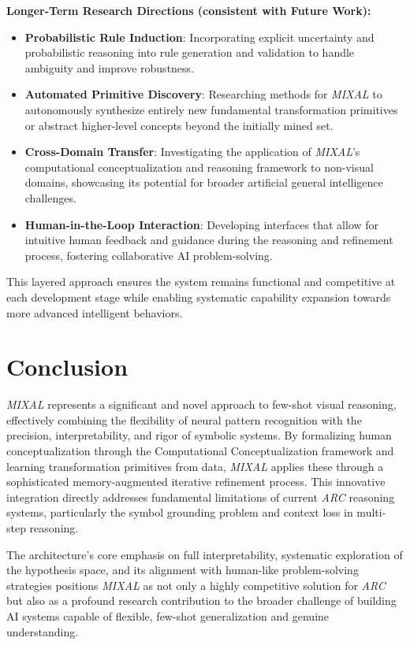 \documentclass[12pt]{article}
\newcommand{\arc}{\textit{ARC}}
\newcommand{\MIXAL}{\textit{MIXAL}}
\begin{document}
\textbf{Longer-Term Research Directions (consistent with Future Work):}
\begin{itemize}[noitemsep,topsep=0pt]
\item\textbf{Probabilistic Rule Induction}: Incorporating explicit uncertainty and probabilistic reasoning into rule generation and validation to handle ambiguity and improve robustness.
\item\textbf{Automated Primitive Discovery}: Researching methods for \MIXAL{} to autonomously synthesize entirely new fundamental transformation primitives or abstract higher-level concepts beyond the initially mined set.
\item\textbf{Cross-Domain Transfer}: Investigating the application of \MIXAL{}'s computational conceptualization and reasoning framework to non-visual domains, showcasing its potential for broader artificial general intelligence challenges.
\item\textbf{Human-in-the-Loop Interaction}: Developing interfaces that allow for intuitive human feedback and guidance during the reasoning and refinement process, fostering collaborative AI problem-solving.
\end{itemize}

This layered approach ensures the system remains functional and competitive at each development stage while enabling systematic capability expansion towards more advanced intelligent behaviors.

\section{Conclusion}

\MIXAL{} represents a significant and novel approach to few-shot visual reasoning, effectively combining the flexibility of neural pattern recognition with the precision, interpretability, and rigor of symbolic systems. By formalizing human conceptualization through the Computational Conceptualization framework and learning transformation primitives from data, \MIXAL{} applies these through a sophisticated memory-augmented iterative refinement process. This innovative integration directly addresses fundamental limitations of current \arc{} reasoning systems, particularly the symbol grounding problem and context loss in multi-step reasoning.

The architecture's core emphasis on full interpretability, systematic exploration of the hypothesis space, and its alignment with human-like problem-solving strategies positions \MIXAL{} as not only a highly competitive solution for \arc{} but also as a profound research contribution to the broader challenge of building AI systems capable of flexible, few-shot generalization and genuine understanding.
\end{document}
